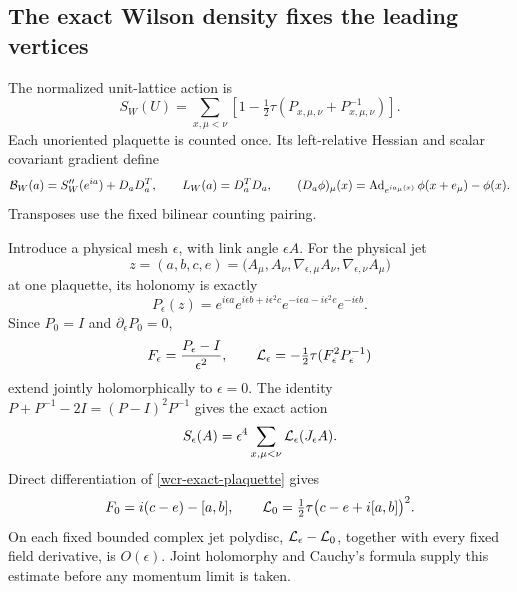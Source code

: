 \documentclass[11pt]{article}
\theoremstyle{remark}
\begin{document}
\subsection{The exact Wilson density fixes the leading vertices}
\label{wcr-density-section}

The normalized unit-lattice action is
\[
 S_W(U)=\sum_{x,\mu<\nu}
 \left[1-\tfrac12\tau(P_{x,\mu,\nu}+P_{x,\mu,\nu}^{-1})\right].
\]
Each unoriented plaquette is counted once. Its left-relative Hessian and
scalar covariant gradient define
\[
 {\cal B}_W(a)=S_W''(e^{ia})+D_aD_a^T,\qquad
 L_W(a)=D_a^TD_a,\qquad
 (D_a\phi)_\mu(x)=\operatorname{Ad}_{e^{ia_\mu(x)}}\phi(x+e_\mu)-\phi(x).
\]
Transposes use the fixed bilinear counting pairing.

Introduce a physical mesh \(\epsilon\), with link angle \(\epsilon A\).
For the physical jet
\[
 z=(a,b,c,e)
 =\bigl(A_\mu,A_\nu,\nabla_{\epsilon,\mu}A_\nu,
                         \nabla_{\epsilon,\nu}A_\mu\bigr)
\]
at one plaquette, its holonomy is exactly
\begin{equation}
 P_\epsilon(z)=e^{i\epsilon a}e^{i\epsilon b+i\epsilon^2c}
              e^{-i\epsilon a-i\epsilon^2e}e^{-i\epsilon b}.
 \label{wcr-exact-plaquette}
\end{equation}
Since \(P_0=I\) and \(\partial_\epsilon P_0=0\),
\[
 F_\epsilon=\frac{P_\epsilon-I}{\epsilon^2},\qquad
 {\cal L}_\epsilon=-\tfrac12\tau(F_\epsilon^2P_\epsilon^{-1})
\]
extend jointly holomorphically to \(\epsilon=0\).
The identity \(P+P^{-1}-2I=(P-I)^2P^{-1}\) gives the exact action
\begin{equation}
 S_\epsilon(A)=\epsilon^4\sum_{x,\mu<\nu}
                 {\cal L}_\epsilon(J_\epsilon A).
 \label{wcr-exact-density}
\end{equation}
Direct differentiation of \eqref{wcr-exact-plaquette} gives
\begin{equation}
 F_0=i(c-e)-[a,b],\qquad
 {\cal L}_0=\tfrac12\tau\bigl(c-e+i[a,b]\bigr)^2.
 \label{wcr-density-limit}
\end{equation}
On each fixed bounded complex jet polydisc,
\({\cal L}_\epsilon-{\cal L}_0\), together with every fixed field
derivative, is \(O(\epsilon)\). Joint holomorphy and Cauchy's formula
supply this estimate before any momentum limit is taken.
\end{document}
